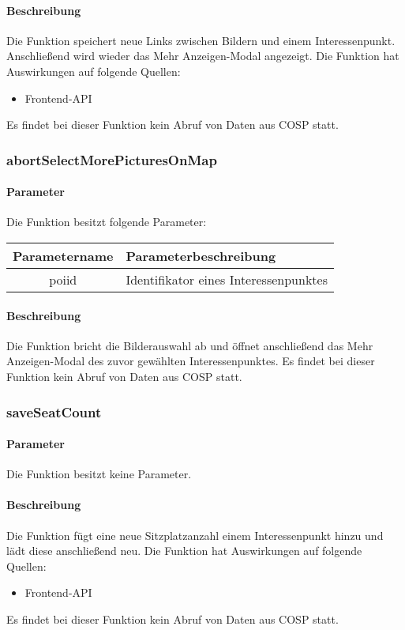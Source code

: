 \paragraph{Beschreibung} Die Funktion speichert neue Links zwischen Bildern und einem Interessenpunkt. Anschließend wird wieder das {\glqq Mehr Anzeigen\grqq}-Modal angezeigt. Die Funktion hat Auswirkungen auf folgende Quellen:
\begin{itemize}
	\item Frontend-API
\end{itemize}
Es findet bei dieser Funktion kein Abruf von Daten aus {\glqq COSP\grqq} statt.
\subsubsection{abortSelectMorePicturesOnMap}
\paragraph{Parameter} Die Funktion besitzt folgende Parameter:
\begin{table}[H]
	\begin{tabular}{|c|p{11cm}|}
		\hline
		\textbf{Parametername} & \textbf{Parameterbeschreibung} \\ \hline
		poiid & Identifikator eines Interessenpunktes \\ \hline
	\end{tabular}
\end{table}
\paragraph{Beschreibung} Die Funktion bricht die Bilderauswahl ab und öffnet anschließend das {\glqq Mehr Anzeigen\grqq}-Modal des zuvor gewählten Interessenpunktes. Es findet bei dieser Funktion kein Abruf von Daten aus {\glqq COSP\grqq} statt.
\subsubsection{saveSeatCount}
\paragraph{Parameter} Die Funktion besitzt keine Parameter.
\paragraph{Beschreibung} Die Funktion fügt eine neue Sitzplatzanzahl einem Interessenpunkt hinzu und lädt diese anschließend neu. Die Funktion hat Auswirkungen auf folgende Quellen:
\begin{itemize}
	\item Frontend-API
\end{itemize}
Es findet bei dieser Funktion kein Abruf von Daten aus {\glqq COSP\grqq} statt.
